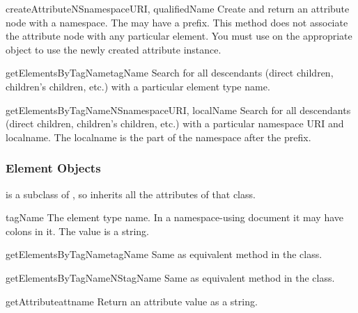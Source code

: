 \begin{methoddesc}[Document]{createAttributeNS}{namespaceURI, qualifiedName}
Create and return an attribute node with a namespace.  The
 may have a prefix.  This method does not associate the
attribute node with any particular element.  You must use
 on the appropriate  object
to use the newly created attribute instance.
\end{methoddesc}

\begin{methoddesc}[Document]{getElementsByTagName}{tagName}
Search for all descendants (direct children, children's children,
etc.) with a particular element type name.
\end{methoddesc}

\begin{methoddesc}[Document]{getElementsByTagNameNS}{namespaceURI, localName}
Search for all descendants (direct children, children's children,
etc.) with a particular namespace URI and localname.  The localname is
the part of the namespace after the prefix.
\end{methoddesc}


\subsubsection{Element Objects \label{dom-element-objects}}

 is a subclass of , so inherits all the
attributes of that class.

\begin{memberdesc}[Element]{tagName}
The element type name.  In a namespace-using document it may have
colons in it.  The value is a string.
\end{memberdesc}

\begin{methoddesc}[Element]{getElementsByTagName}{tagName}
Same as equivalent method in the  class.
\end{methoddesc}

\begin{methoddesc}[Element]{getElementsByTagNameNS}{tagName}
Same as equivalent method in the  class.
\end{methoddesc}

\begin{methoddesc}[Element]{getAttribute}{attname}
Return an attribute value as a string.
\end{methoddesc}

